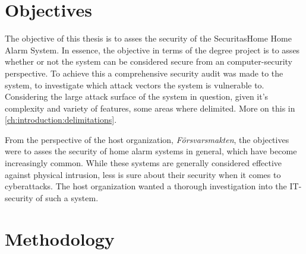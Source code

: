 \section{Objectives} \label{ch:introduction:objectives}

The objective of this thesis is to asses the security of the SecuritasHome Home Alarm System. In essence, the objective in terms of the degree project is to asses whether or not the system can be considered secure from an computer-security perspective. To achieve this a comprehensive security audit was made to the system, to investigate which attack vectors the system is vulnerable to. Considering the large attack surface of the system in question, given it's complexity and variety of features, some areas where delimited. More on this in \ref{ch:introduction:delimitations}.

From the perspective of the host organization, \textit{Försvarsmakten}, the objectives were to asses the security of home alarm systems in general, which have become increasingly common. While these systems are generally considered effective against physical intrusion, less is sure about their security when it comes to cyberattacks. The host organization wanted a thorough investigation into the IT-security of such a system.

\section{Methodology} \label{ch:introduction:methodology}

